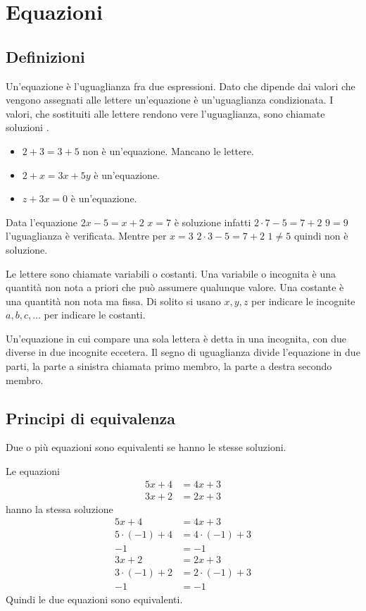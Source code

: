 \chapter{Equazioni}
\label{sec:equazioni}
\section{Definizioni}
Un'equazione è l'uguaglianza fra due espressioni. Dato che dipende dai valori che vengono assegnati alle lettere un'equazione è un'uguaglianza condizionata. I valori, che sostituiti alle lettere rendono vere l'uguaglianza,  sono chiamate soluzioni . 
\begin{esempio}
\begin{itemize}
\item $2+3=3+5$ non è un'equazione. Mancano le lettere.
\item $2+x=3x+5y$ è un'equazione. 
\item $z+3x=0$ è un'equazione.
\end{itemize}
\end{esempio}
\begin{esempio}
Data l'equazione $2x-5=x+2$ $x=7$ è soluzione infatti $2\cdot 7-5=7+2$ $9=9$ l'uguaglianza è verificata. Mentre per $x=3$ $2\cdot 3-5=7+2$ $1\neq5$ quindi non è soluzione.
\end{esempio}
Le lettere sono chiamate variabili o costanti. Una variabile o incognita è una quantità non nota a priori che può assumere qualunque valore. Una costante è una quantità non nota ma fissa. Di solito si usano $x,y,z$ per indicare le incognite $a,b,c,\dots$ per indicare le costanti.  

Un'equazione in cui compare una sola lettera è detta in una incognita, con due diverse in due incognite eccetera. Il segno di uguaglianza divide l'equazione in due parti, la parte a sinistra chiamata primo membro, la parte a destra secondo membro.
\section{Principi di equivalenza}
Due o più equazioni sono equivalenti se hanno le stesse soluzioni.
\begin{esempio}
Le equazioni 
\begin{align*}
5x+4&=4x+3\\
3x+2&=2x+3
\end{align*}
hanno la stessa soluzione
\begin{align*}
5x+4&=4x+3\\
5\cdot(-1)+4&=4\cdot(-1)+3\\
-1&=-1\\
3x+2&=2x+3\\
3\cdot(-1)+2&=2\cdot(-1)+3\\
-1&=-1
\end{align*}
Quindi le due equazioni sono equivalenti.
\end{esempio}

